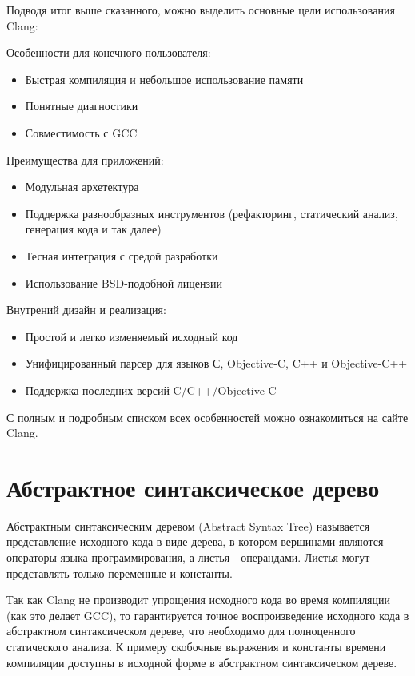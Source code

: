 Подводя итог выше сказанного, можно выделить основные цели использования Clang:

Особенности для конечного пользователя:
\begin{itemize}
\item Быстрая компиляция и небольшое использование памяти
\item Понятные диагностики
\item Совместимость с GCC
\end{itemize}

Преимущества для приложений:
\begin{itemize}
\item Модульная архетектура
\item Поддержка разнообразных инструментов (рефакторинг, статический анализ, генерация кода и так далее)
\item Тесная интеграция с средой разработки
\item Использование BSD-подобной лицензии
\end{itemize}

Внутрений дизайн и реализация:
\begin{itemize}
\item Простой и легко изменяемый исходный код
\item Унифицированный парсер для языков С, Objective-C, C++ и Objective-C++
\item Поддержка последних версий C/C++/Objective-C
\end{itemize}

С полным и подробным списком всех особенностей можно ознакомиться на сайте Clang.

\section{Абстрактное синтаксическое дерево}
Абстрактным синтаксическим деревом (Abstract Syntax Tree) называется представление исходного кода 
в виде дерева, в котором вершинами являются операторы языка программирования, а листья - операндами.
Листья могут представлять только переменные и константы. 

Так как Clang не производит упрощения исходного кода во время компиляции (как это делает GCC),
то гарантируется точное воспроизведение исходного кода в абстрактном синтаксическом дереве, 
что необходимо для полноценного статического анализа. К примеру скобочные выражения и константы
времени компиляции доступны в исходной форме в абстрактном синтаксическом дереве.

